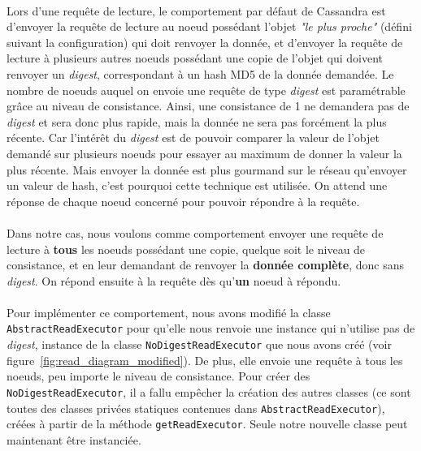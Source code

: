 \documentclass[12pt]{article}
\newcommand{\class}[1]{\texttt{#1}}
\begin{document}
\paragraph{}Lors d'une requête de lecture, le comportement par défaut de Cassandra est d'envoyer la requête de lecture au noeud possédant l'objet \textit{"le plus proche"} (défini suivant la configuration) qui doit renvoyer la donnée, et d'envoyer la requête de lecture à plusieurs autres noeuds possédant une copie de l'objet qui doivent renvoyer un \textit{digest}, correspondant à un hash MD5 de la donnée demandée. Le nombre de noeuds auquel on envoie une requête de type \textit{digest} est paramétrable grâce au niveau de consistance. Ainsi, une consistance de 1 ne demandera pas de \textit{digest} et sera donc plus rapide, mais la donnée ne sera pas forcément la plus récente. Car l'intérêt du \textit{digest} est de pouvoir comparer la valeur de l'objet demandé sur plusieurs noeuds pour essayer au maximum de donner la valeur la plus récente. Mais envoyer la donnée est plus gourmand sur le réseau qu'envoyer un valeur de hash, c'est pourquoi cette technique est utilisée. On attend une réponse de chaque noeud concerné pour pouvoir répondre à la requête.

\paragraph{}Dans notre cas, nous voulons comme comportement envoyer une requête de lecture à \textbf{tous} les noeuds possédant une copie, quelque soit le niveau de consistance, et en leur demandant de renvoyer la \textbf{donnée complète}, donc sans \textit{digest}. On répond ensuite à la requête dès qu'\textbf{un} noeud à répondu.

\paragraph{}Pour implémenter ce comportement, nous avons modifié la classe \class{AbstractReadExecutor} pour qu'elle nous renvoie une instance qui n'utilise pas de \textit{digest}, instance de la classe \class{NoDigestReadExecutor} que nous avons créé (voir figure~\ref{fig:read_diagram_modified}). De plus, elle envoie une requête à tous les noeuds, peu importe le niveau de consistance. Pour créer des \class{NoDigestReadExecutor}, il a fallu empêcher la création des autres classes (ce sont toutes des classes privées statiques contenues dans \class{AbstractReadExecutor}), créées à partir de la méthode \texttt{getReadExecutor}. Seule notre nouvelle classe peut maintenant être instanciée.
\end{document}
